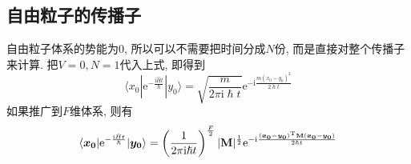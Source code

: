         \subsection{自由粒子的传播子}

        自由粒子体系的势能为0, 所以可以不需要把时间分成$N$份, 而是直接对整个传播子来计算. 把$V=0,N=1$代入上式, 即得到
        \begin{equation}\label{eq:8-2-2}
            \langle x_0 | \mathrm{e}^{-\frac {\mathrm{i}\hat{H}t}{\hslash}} | y_0 \rangle 
            = \sqrt{\frac {m}{2\pi\mathrm{i} \hslash t}} \mathrm{e}^{-\mathrm{i}\frac {m(x_0 - y_0)^2}{2\hslash t}}
        \end{equation}
        如果推广到$F$维体系, 则有
        \begin{equation}
            \langle \bm{x_0} | \mathrm{e}^{-\frac {\mathrm{i}\hat{H}t}{\hslash}} |\bm{y_0} \rangle 
            = \left(\frac {1}{2\pi\mathrm{i} \hslash t} \right)^{\frac F2} |\mathbf{M}|^{\frac 12} \mathrm{e}^{-\mathrm{i}\frac {(\bm{x_0}-\bm{y_0})^{\mathrm{T}} \mathbf{M} (\bm{x_0}-\bm{y_0})}{2\hslash t}}
        \end{equation}

        \splitline

